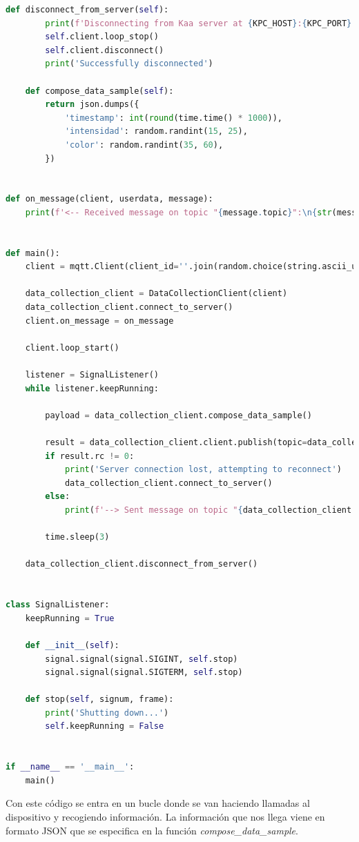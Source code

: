 {\begin{lstlisting}[language=Python]
    def disconnect_from_server(self):
        print(f'Disconnecting from Kaa server at {KPC_HOST}:{KPC_PORT}...')
        self.client.loop_stop()
        self.client.disconnect()
        print('Successfully disconnected')

    def compose_data_sample(self):
        return json.dumps({
            'timestamp': int(round(time.time() * 1000)),
            'intensidad': random.randint(15, 25),
            'color': random.randint(35, 60),
        })


def on_message(client, userdata, message):
    print(f'<-- Received message on topic "{message.topic}":\n{str(message.payload.decode("utf-8"))}')


def main():
    client = mqtt.Client(client_id=''.join(random.choice(string.ascii_uppercase + string.digits) for _ in range(6)))

    data_collection_client = DataCollectionClient(client)
    data_collection_client.connect_to_server()
    client.on_message = on_message

    client.loop_start()

    listener = SignalListener()
    while listener.keepRunning:

        payload = data_collection_client.compose_data_sample()

        result = data_collection_client.client.publish(topic=data_collection_client.data_collection_topic, payload=payload)
        if result.rc != 0:
            print('Server connection lost, attempting to reconnect')
            data_collection_client.connect_to_server()
        else:
            print(f'--> Sent message on topic "{data_collection_client.data_collection_topic}":\n{payload}')

        time.sleep(3)

    data_collection_client.disconnect_from_server()


class SignalListener:
    keepRunning = True

    def __init__(self):
        signal.signal(signal.SIGINT, self.stop)
        signal.signal(signal.SIGTERM, self.stop)

    def stop(self, signum, frame):
        print('Shutting down...')
        self.keepRunning = False


if __name__ == '__main__':
    main()
\end{lstlisting}

Con este código se entra en un bucle donde se van haciendo llamadas al dispositivo y recogiendo información. La información que nos llega viene en formato JSON que se especifica en la función \textit{compose\_data\_sample}.

}